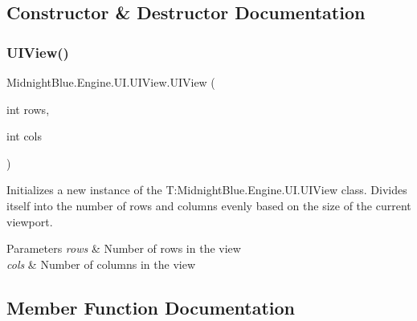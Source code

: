 \subsection{Constructor \& Destructor Documentation}
\hypertarget{class_midnight_blue_1_1_engine_1_1_u_i_1_1_u_i_view_a6b2875471139a91f14655d1665ebad21}{}\label{class_midnight_blue_1_1_engine_1_1_u_i_1_1_u_i_view_a6b2875471139a91f14655d1665ebad21} 
\subsubsection{\texorpdfstring{U\+I\+View()}{UIView()}}
{\footnotesize\ttfamily Midnight\+Blue.\+Engine.\+U\+I.\+U\+I\+View.\+U\+I\+View (\begin{DoxyParamCaption}\item[{int}]{rows,  }\item[{int}]{cols }\end{DoxyParamCaption})\hspace{0.3cm}{\ttfamily [inline]}}



Initializes a new instance of the T\+:\+Midnight\+Blue.\+Engine.\+U\+I.\+U\+I\+View class. Divides itself into the number of rows and columns evenly based on the size of the current viewport. 


\begin{DoxyParams}{Parameters}
{\em rows} & Number of rows in the view\\
\hline
{\em cols} & Number of columns in the view\\
\hline
\end{DoxyParams}


\subsection{Member Function Documentation}
\hypertarget{class_midnight_blue_1_1_engine_1_1_u_i_1_1_u_i_view_a46705046c44aec1a6ca1d99a2d39194d}{}\label{class_midnight_blue_1_1_engine_1_1_u_i_1_1_u_i_view_a46705046c44aec1a6ca1d99a2d39194d} 
